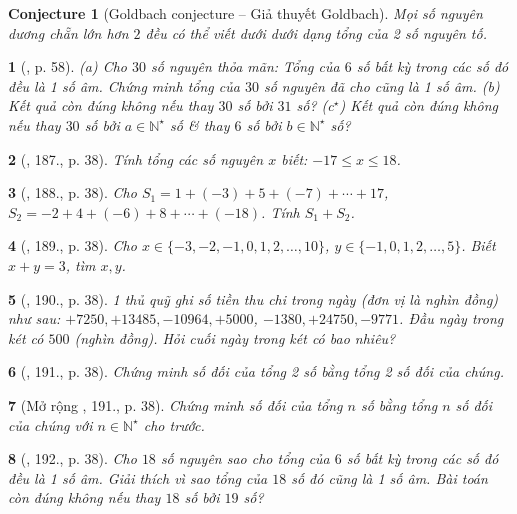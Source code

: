 \documentclass{article}
\newtheorem{baitoan}{}
\newtheorem{conjecture}{Conjecture}
\begin{document}
\begin{conjecture}[Goldbach conjecture -- Giả thuyết Goldbach]
	Mọi số nguyên dương chẵn lớn hơn $2$ đều có thể viết dưới dưới dạng tổng của 2 số nguyên tố.
\end{conjecture}

\begin{baitoan}[\cite{Binh_boi_duong_Toan_6_tap_1}, p. 58]
	(a) Cho $30$ số nguyên thỏa mãn: Tổng của $6$ số bất kỳ trong các số đó đều là 1 số âm. Chứng minh tổng của $30$ số nguyên đã cho cũng là 1 số âm. (b) Kết quả còn đúng không nếu thay $30$ số bởi $31$ số? (c${}^\star$) Kết quả còn đúng không nếu thay $30$ số bởi $a\in\mathbb{N}^\star$ số \& thay $6$ số bởi $b\in\mathbb{N}^\star$ số?
\end{baitoan}

\begin{baitoan}[\cite{Tuyen_Toan_6}, 187., p. 38]
	Tính tổng các số nguyên $x$ biết: $-17\le x\le18$.
\end{baitoan}

\begin{baitoan}[\cite{Tuyen_Toan_6}, 188., p. 38]
	Cho $S_1 = 1 + (-3) + 5 + (-7) + \cdots + 17$, $S_2 = -2 + 4 + (-6) + 8 + \cdots + (-18)$. Tính $S_1 + S_2$.
\end{baitoan}

\begin{baitoan}[\cite{Tuyen_Toan_6}, 189., p. 38]
	Cho $x\in\{-3,-2,-1,0,1,2,\ldots,10\}$, $y\in\{-1,0,1,2,\ldots,5\}$. Biết $x + y = 3$, tìm $x,y$.
\end{baitoan}

\begin{baitoan}[\cite{Tuyen_Toan_6}, 190., p. 38]
	1 thủ quỹ ghi số tiền thu chi trong ngày (đơn vị là nghìn đồng) như sau: $+7250,+13485,-10964,+5000$, $-1380,+24750,-9771$. Đầu ngày trong két có $500$ (nghìn đồng). Hỏi cuối ngày trong két có bao nhiêu?
\end{baitoan}

\begin{baitoan}[\cite{Tuyen_Toan_6}, 191., p. 38]
	Chứng minh số đối của tổng 2 số bằng tổng 2 số đối của chúng.
\end{baitoan}

\begin{baitoan}[Mở rộng \cite{Tuyen_Toan_6}, 191., p. 38]
	Chứng minh số đối của tổng $n$ số bằng tổng $n$ số đối của chúng với $n\in\mathbb{N}^\star$ cho trước.
\end{baitoan}

\begin{baitoan}[\cite{Tuyen_Toan_6}, 192., p. 38]
	Cho $18$ số nguyên sao cho tổng của $6$ số bất kỳ trong các số đó đều là 1 số âm. Giải thích vì sao tổng của $18$ số đó cũng là 1 số âm. Bài toán còn đúng không nếu thay $18$ số bởi $19$ số?
\end{baitoan}
\end{document}
